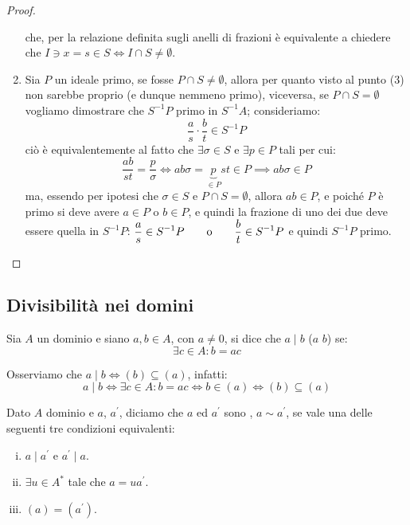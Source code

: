 \documentclass[11pt]{scrartcl}
\begin{document}
\begin{proof}
\begin{enumerate}[(1)]
            che, per la relazione definita sugli anelli di frazioni è equivalente a chiedere che $I \ni x = s \in S \iff I \cap S \ne \emptyset$.
        \item Sia $P$ un ideale primo, se fosse $P \cap S \ne \emptyset$, allora per quanto visto al punto (3) non sarebbe proprio (e dunque nemmeno primo), viceversa, se $P \cap S = \emptyset$ vogliamo dimostrare che $S^{-1}P$ primo in $S^{-1}A$; consideriamo:
                \[ \frac{a}{s} \cdot \frac{b}{t} \in S^{-1}P
                    \]
            ciò è equivalentemente al fatto che $\exists \sigma \in S$ e $\exists p \in P$ tali per cui:
                \[ \frac{ab}{st} = \frac{p}{\sigma} \iff ab\sigma = \underbrace{p}_{\in P}st \in P \implies ab\sigma \in P
                    \]
            ma, essendo per ipotesi che $\sigma \in S$ e $P \cap S = \emptyset$, allora $ab \in P$, e poiché $P$ è primo si deve avere $a \in P$ o $b \in P$, e quindi la frazione di uno dei due deve essere quella in $S^{-1}P$: $\displaystyle\frac{a}{s} \in S^{-1}P \qquad \text o \qquad \frac{b}{t} \in S^{-1}P$
            e quindi $S^{-1}P$ primo.
    \end{enumerate}
\end{proof}

\newpage
\subsection{Divisibilità nei domini}
\begin{definition}
    Sia $A$  un dominio e siano $a,b \in A$, con $a \ne 0$, si dice che $a \mid b$ ($a$  $b$) se:
    \[ \exists c \in A : b = ac
        \]
\end{definition}

\begin{remark}
    Osserviamo che $a \mid b \iff (b) \subseteq (a)$, infatti:
    \[ a \mid b \iff \exists c \in A : b = ac \iff b \in (a) \iff (b) \subseteq (a)
        \]
\end{remark}

\begin{definition}
    Dato $A$ dominio e $a$, $a^{\prime}$, diciamo che $a$ ed $a^{\prime}$ sono , $a \sim a^{\prime}$,
    se vale una delle seguenti tre condizioni equivalenti:
    \begin{enumerate}[(i)]
        \item $a \mid a^{\prime}$ e $a^{\prime} \mid a$.
        \item $\exists u \in A^*$ tale che $a = ua^{\prime}$.
        \item $(a) = (a^{\prime})$.
    \end{enumerate}
\end{definition}
\end{document}
